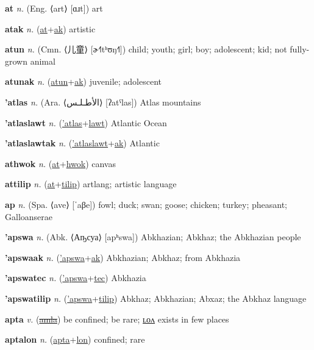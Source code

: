 \textbf{\hypertarget{at}{at}} \textit{n.} (Eng. ⟨art⟩ [ɑɹt])
art

\textbf{\hypertarget{atak}{atak}} \textit{n.} (\hyperlink{at}{at}+\allowbreak \hyperlink{ak}{ak})
artistic

\textbf{\hypertarget{atun}{atun}} \textit{n.} (Cmn. ⟨{\chinese{}儿童}⟩ [ɚ˧˥tʰʊŋ˧˥])
child; youth; girl; boy; adolescent; kid; not fully-grown animal

\textbf{\hypertarget{atunak}{atunak}} \textit{n.} (\hyperlink{atun}{atun}+\allowbreak \hyperlink{ak}{ak})
juvenile; adolescent

\textbf{\hypertarget{'atlas}{'atlas}} \textit{n.} (Ara. ⟨{\arabics{}الأطـلـس‎}⟩ [ʔatˤlas])
Atlas mountains

\textbf{\hypertarget{'atlaslawt}{'atlaslawt}} \textit{n.} (\hyperlink{'atlas}{'atlas}+\allowbreak \hyperlink{lawt}{lawt})
Atlantic Ocean

\textbf{\hypertarget{'atlaslawtak}{'atlaslawtak}} \textit{n.} (\hyperlink{'atlaslawt}{'atlaslawt}+\allowbreak \hyperlink{ak}{ak})
Atlantic

\textbf{\hypertarget{athwok}{athwok}} \textit{n.} (\hyperlink{at}{at}+\allowbreak \hyperlink{hwok}{hwok})
canvas

\textbf{\hypertarget{attilip}{attilip}} \textit{n.} (\hyperlink{at}{at}+\allowbreak \hyperlink{tilip}{tilip})
artlang; artistic language

\textbf{\hypertarget{ap}{ap}} \textit{n.} (Spa. ⟨ave⟩ [ˈaβe])
fowl; duck; swan; goose; chicken; turkey; pheasant; Galloanserae

\textbf{\hypertarget{'apswa}{'apswa}} \textit{n.} (Abk. ⟨Аҧсуа⟩ [apʰswa])
Abkhazian; Abkhaz; the Abkhazian people

\textbf{\hypertarget{'apswaak}{'apswaak}} \textit{n.} (\hyperlink{'apswa}{'apswa}+\allowbreak \hyperlink{ak}{ak})
Abkhazian; Abkhaz; from Abkhazia

\textbf{\hypertarget{'apswatec}{'apswatec}} \textit{n.} (\hyperlink{'apswa}{'apswa}+\allowbreak \hyperlink{tec}{tec})
Abkhazia

\textbf{\hypertarget{'apswatilip}{'apswatilip}} \textit{n.} (\hyperlink{'apswa}{'apswa}+\allowbreak \hyperlink{tilip}{tilip})
Abkhaz; Abkhazian; Abxaz; the Abkhaz language

\textbf{\hypertarget{apta}{apta}} \textit{v.} (\hyperlink{amla}{\sout{amla}})
be confined; be rare; \hyperlink{aptalon}{ʟᴏᴧ} exists in few places

\textbf{\hypertarget{aptalon}{aptalon}} \textit{n.} (\hyperlink{apta}{apta}+\allowbreak \hyperlink{lon}{lon})
confined; rare

